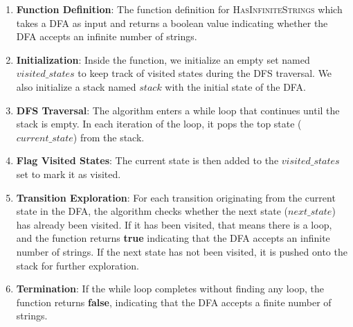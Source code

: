 \documentclass[letterpaper,12pt]{article}
\begin{document}
\begin{enumerate}
    \item \textbf{Function Definition}: The function definition for \textsc{HasInfiniteStrings} which takes a DFA as input and returns a boolean value indicating whether the DFA accepts an infinite number of strings.
    
    \item \textbf{Initialization}: Inside the function, we initialize an empty set named $visited\_states$ to keep track of visited states during the DFS traversal. We also initialize a stack named $stack$ with the initial state of the DFA.
    
    \item \textbf{DFS Traversal}: The algorithm enters a while loop that continues until the stack is empty. In each iteration of the loop, it pops the top state ($current\_state$) from the stack.
    
    \item \textbf{Flag Visited States}: The current state is then added to the $visited\_states$ set to mark it as visited.
    
    \item \textbf{Transition Exploration}: For each transition originating from the current state in the DFA, the algorithm checks whether the next state ($next\_state$) has already been visited. If it has been visited, that means there is a loop, and the function returns \textbf{true} indicating that the DFA accepts an infinite number of strings. If the next state has not been visited, it is pushed onto the stack for further exploration.
    
    \item \textbf{Termination}: If the while loop completes without finding any loop, the function returns \textbf{false}, indicating that the DFA accepts a finite number of strings.
\end{enumerate}
\end{document}
